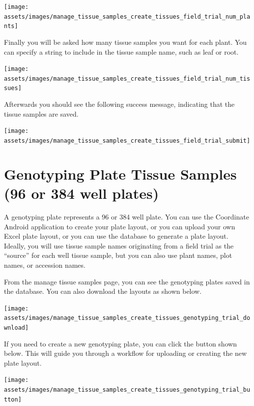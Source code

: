 \documentclass[
  12pt,
]{book}
\begin{document}
\begin{center}\texttt{[image: assets/images/manage\_tissue\_samples\_create\_tissues\_field\_trial\_num\_plants]} \end{center}

Finally you will be asked how many tissue samples you want for each plant. You can specify a string to include in the tissue sample name, such as leaf or root.

\begin{center}\texttt{[image: assets/images/manage\_tissue\_samples\_create\_tissues\_field\_trial\_num\_tissues]} \end{center}

Afterwards you should see the following success message, indicating that the tissue samples are saved.

\begin{center}\texttt{[image: assets/images/manage\_tissue\_samples\_create\_tissues\_field\_trial\_submit]} \end{center}

\hypertarget{genotyping-plate-tissue-samples-96-or-384-well-plates}{%
\section{Genotyping Plate Tissue Samples (96 or 384 well plates)}\label{genotyping-plate-tissue-samples-96-or-384-well-plates}}

A genotyping plate represents a 96 or 384 well plate. You can use the Coordinate Android application to create your plate layout, or you can upload your own Excel plate layout, or you can use the database to generate a plate layout. Ideally, you will use tissue sample names originating from a field trial as the ``source'' for each well tissue sample, but you can also use plant names, plot names, or accession names.

From the manage tissue samples page, you can see the genotyping plates saved in the database. You can also download the layouts as shown below.

\begin{center}\texttt{[image: assets/images/manage\_tissue\_samples\_create\_tissues\_genotyping\_trial\_download]} \end{center}

If you need to create a new genotyping plate, you can click the button shown below. This will guide you through a workflow for uploading or creating the new plate layout.

\begin{center}\texttt{[image: assets/images/manage\_tissue\_samples\_create\_tissues\_genotyping\_trial\_button]} \end{center}
\end{document}
